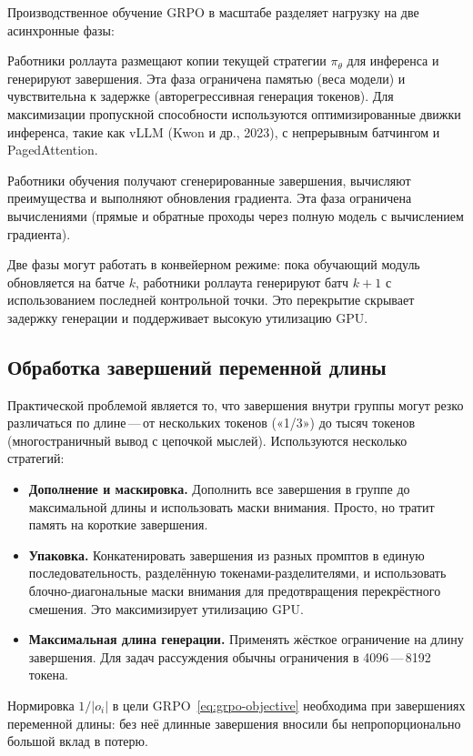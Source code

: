 Производственное обучение GRPO в масштабе разделяет нагрузку на две асинхронные фазы:
\begin{description}[leftmargin=!,labelwidth=3.5cm]
  \item[Фаза генерации] Работники роллаута размещают копии текущей стратегии $\pi_\theta$ для инференса и генерируют завершения. Эта фаза ограничена памятью (веса модели) и чувствительна к задержке (авторегрессивная генерация токенов). Для максимизации пропускной способности используются оптимизированные движки инференса, такие как vLLM (Kwon и др., 2023), с непрерывным батчингом и PagedAttention.
  \item[Фаза обучения] Работники обучения получают сгенерированные завершения, вычисляют преимущества и выполняют обновления градиента. Эта фаза ограничена вычислениями (прямые и обратные проходы через полную модель с вычислением градиента).
\end{description}
Две фазы могут работать в конвейерном режиме: пока обучающий модуль обновляется на батче $k$, работники роллаута генерируют батч $k+1$ с использованием последней контрольной точки. Это перекрытие скрывает задержку генерации и поддерживает высокую утилизацию GPU.

\subsection{Обработка завершений переменной длины}

Практической проблемой является то, что завершения внутри группы могут резко различаться по длине\,---\,от нескольких токенов («1/3») до тысяч токенов (многостраничный вывод с цепочкой мыслей). Используются несколько стратегий:
\begin{itemize}[leftmargin=*]
  \item \textbf{Дополнение и маскировка.} Дополнить все завершения в группе до максимальной длины и использовать маски внимания. Просто, но тратит память на короткие завершения.
  \item \textbf{Упаковка.} Конкатенировать завершения из разных промптов в единую последовательность, разделённую токенами-разделителями, и использовать блочно-диагональные маски внимания для предотвращения перекрёстного смешения. Это максимизирует утилизацию GPU.
  \item \textbf{Максимальная длина генерации.} Применять жёсткое ограничение на длину завершения. Для задач рассуждения обычны ограничения в 4096\,---\,8192 токена.
\end{itemize}
Нормировка $1/|o_i|$ в цели GRPO~\eqref{eq:grpo-objective} необходима при завершениях переменной длины: без неё длинные завершения вносили бы непропорционально большой вклад в потерю.


